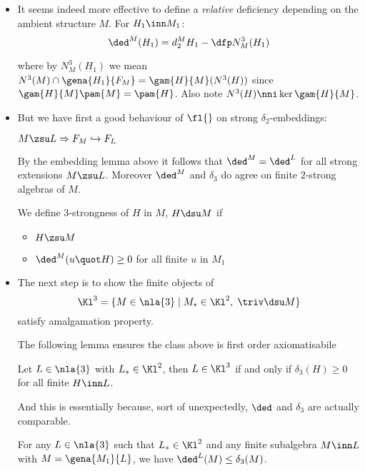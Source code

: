 \documentclass[a4paper,11pt,german,english]{report}
\begin{document}
\begin{itemize}
\item[]It seems indeed more effective to define a {\em relative} deficiency depending
on the ambient structure $M$. For $H_{1}\inn M_{1}$:
$$\ded^{M}(H_{1})=d^{M}_{2}H_{1}-\dfp N^{3}_{M}(H_{1})$$

where by $N^{3}_{M}(H_{1})$ we mean $N^{3}(M)\cap\gena{H_{1}}{F_{M}}=\gam{H}{M}
(N^{3}(H))$ since $\gam{H}{M}\pam{M}=\pam{H}$.
Also note $N^{3}(H)\nni\ker\gam{H}{M}$.

\item[]But we have first a good behaviour of $\fl{}$ on strong $\delta_{2}$-embeddings:

\begin{lem*}$M\zsu L\Rightarrow F_{M}\hookrightarrow F_{L}$
\end{lem*}


By the embedding lemma above
it follows that $\ded^{M}=\ded^{L}$ for all strong extensions $M\zsu L$.
Moreover $\ded^{M}$ and $\delta_{3}$ do agree on finite $2$-strong algebras of $M$.

We define $3$-strongness of $H$ in $M$, $H\dsu M$ if
\begin{itemize}
\item $H\zsu M$
\item $\ded^{M}(u\quot H)\geq0$ for all finite $u$ in $M_{1}$
\end{itemize}
\item[]The next step is to show the finite objects of
$$\Kl^{3}=\{M\in\nla{3}\mid M_{*}\in\Kl^{2},\;\triv\dsu M\}$$
satisfy amalgamation property.

The following lemma ensures the class above
is first order axiomatisabile
\begin{lem*}
Let $L\in\nla{3}$ with $L_{*}\in\Kl^{2}$, then  $L\in\Kl^{3}$ if and only
if $\delta_{3}(H)\geq0$ for all finite $H\inn L$.
\end{lem*}

And this is essentially because, sort of unexpectedly, $\ded$ and $\delta_{3}$
are actually comparable.
\begin{lem*}
For any $L\in\nla{3}$ such that $L_{*}\in\Kl^{2}$ and any finite subalgebra $M\inn L$ with $M=\gena{M_{1}}{L}$, we have
$\ded^{L}(M)\leq\delta_{3}(M)$.
\end{lem*}


\end{itemize}
\end{document}
